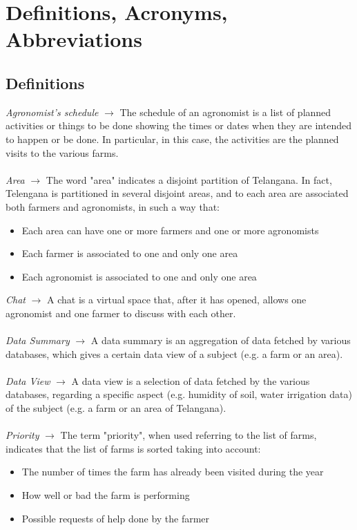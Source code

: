 \documentclass[10pt]{report}
\begin{document}
    \section{Definitions, Acronyms, Abbreviations}
    \subsection{Definitions}
    \emph{Agronomist's schedule} $\rightarrow$ The schedule of an agronomist is a list of planned activities or things to be done showing the times or dates when they are intended to happen or be done. In particular, in this case, the activities are the planned visits to the various farms.
    \\ \\
    \emph{Area} $\rightarrow$ The word "area" indicates a disjoint partition of Telangana. In fact, Telengana is partitioned in several disjoint areas, and to each area are associated both farmers and agronomists, in such a way that:
    \begin{itemize}
        \item Each area can have one or more farmers and one or more agronomists
        \item Each farmer is associated to one and only one area
        \item Each agronomist is associated to one and only one area
    \end{itemize}
    \emph{Chat} $\rightarrow$ A chat is a virtual space that, after it has opened, allows one agronomist and one farmer to discuss with each other.
    \\ \\
    \emph{Data Summary} $\rightarrow$ A data summary is an aggregation of data fetched by various databases, which gives a certain data view of a subject (e.g. a farm or an area).
    \\ \\
    \emph{Data View} $\rightarrow$ A data view is a selection of data fetched by the various databases, regarding a specific aspect (e.g. humidity of soil, water irrigation data) of the subject (e.g. a farm or an area of Telangana).
    \\ \\
    \emph{Priority} $\rightarrow$ The term "priority", when used referring to the list of farms, indicates that the list of farms is sorted taking into account:
    \begin{itemize}
        \item The number of times the farm has already been visited during the year
        \item How well or bad the farm is performing
        \item Possible requests of help done by the farmer
    \end{itemize}
\end{document}
